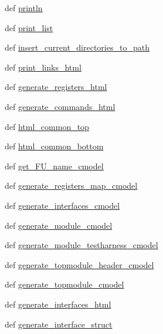 \begin{DoxyCompactItemize}
def \hyperlink{namespaceverilog__generator_a95555fb0931ad8a3c70bad808563086e}{println}
\item 
def \hyperlink{namespaceverilog__generator_a7e878a82aae33cc466225575289dd5e3}{print\-\_\-list}
\item 
def \hyperlink{namespaceverilog__generator_a237963892d969bbd25ebe75ca472479a}{insert\-\_\-current\-\_\-directories\-\_\-to\-\_\-path}
\item 
def \hyperlink{namespaceverilog__generator_a099831c9fef45a43cd0009ee0f5873d6}{print\-\_\-links\-\_\-html}
\item 
def \hyperlink{namespaceverilog__generator_a774aef0ca9ecbe98e9d9759eb055471e}{generate\-\_\-registers\-\_\-html}
\item 
def \hyperlink{namespaceverilog__generator_a6f4f66bd3720a318a2e1693b8a26b3e4}{generate\-\_\-commands\-\_\-html}
\item 
def \hyperlink{namespaceverilog__generator_a256b187a47e584614f72f65dd7c8e2ad}{html\-\_\-common\-\_\-top}
\item 
def \hyperlink{namespaceverilog__generator_a4ed941607000ed260e676a05943c6390}{html\-\_\-common\-\_\-bottom}
\item 
def \hyperlink{namespaceverilog__generator_ad20a5ed82a60f252fee1f60ea97e29ff}{get\-\_\-\-F\-U\-\_\-name\-\_\-cmodel}
\item 
def \hyperlink{namespaceverilog__generator_accda53358dd92e65f65f8ef4309e262c}{generate\-\_\-registers\-\_\-map\-\_\-cmodel}
\item 
def \hyperlink{namespaceverilog__generator_a4aba86b85f6fbe161aa1a7990b89d96a}{generate\-\_\-interfaces\-\_\-cmodel}
\item 
def \hyperlink{namespaceverilog__generator_aa5689ca2829cf3f64e0097bd159b5933}{generate\-\_\-module\-\_\-cmodel}
\item 
def \hyperlink{namespaceverilog__generator_a4ff270eafc24d60823ebfdd8a4cd6b59}{generate\-\_\-module\-\_\-testharness\-\_\-cmodel}
\item 
def \hyperlink{namespaceverilog__generator_ada03eee25ccf847803a8f352adab0e5a}{generate\-\_\-topmodule\-\_\-header\-\_\-cmodel}
\item 
def \hyperlink{namespaceverilog__generator_a645fa70de712f9a0926b2805f3a95fbb}{generate\-\_\-topmodule\-\_\-cmodel}
\item 
def \hyperlink{namespaceverilog__generator_a2c8556c01a78c2889ec573e73c3fc818}{generate\-\_\-interfaces\-\_\-html}
\item 
def \hyperlink{namespaceverilog__generator_a5e9a6f47ee1499d20e96b8218ae3c076}{generate\-\_\-interface\-\_\-struct}

\end{DoxyCompactItemize}
